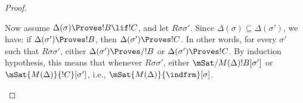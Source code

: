 \documentclass[../../../include/open-logic-section]{subfiles}
\begin{document}
\begin{proof}
\begin{enumerate}
{        Now assume $\Delta(\sigma) \Proves !B \lif !C$, and let
        $R\sigma\sigma'$. Since $\Delta(\sigma) \subseteq
        \Delta(\sigma')$, we have: if $\Delta(\sigma') \Proves
        !B$, then $\Delta(\sigma') \Proves !C$. In other words, for
        every $\sigma'$ such that $R\sigma\sigma'$, either
        $\Delta(\sigma') \Proves/ !B$ or $\Delta(\sigma') \Proves
        !C$. By induction hypothesis, this means that whenever
        $R\sigma\sigma'$, either $\mSat/{M(\Delta)}{!B}[\sigma']$ or
        $\mSat{M(\Delta)}{!C}[\sigma']$, i.e.,
        $\mSat{M(\Delta)}{\indfrm}[\sigma]$.}
  \end{enumerate}
\end{proof}
\end{document}
